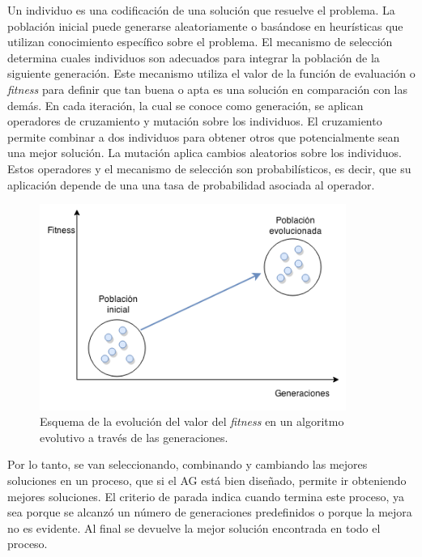 Un individuo es una codificación de una solución que resuelve el problema. La población inicial puede generarse aleatoriamente o basándose en heurísticas que utilizan conocimiento específico sobre el problema. El mecanismo de selección determina cuales individuos son adecuados para integrar la población de la siguiente generación. Este mecanismo utiliza el valor de la función de evaluación o \emph{fitness} para definir que tan buena o apta es una solución en comparación con las demás. En cada iteración, la cual se conoce como generación, se aplican operadores de cruzamiento y mutación sobre los individuos. El cruzamiento permite combinar a dos individuos para obtener otros que potencialmente sean una mejor solución. La mutación aplica cambios aleatorios sobre los individuos. Estos operadores y el mecanismo de selección son probabilísticos, es decir, que su aplicación depende de una una tasa de probabilidad asociada al operador.


\begin{figure}[ht]
	\centering
	\includegraphics[width=10cm]{Figures/fitness_generaciones}
	\caption[Esquema de la evolución del valor del fitness en un algoritmo evolutivo ]{Esquema de la evolución del valor del \emph{fitness} en un algoritmo evolutivo a través de las generaciones.}
	\label{fig:fitness_generaciones}
\end{figure}

Por lo tanto, se van seleccionando, combinando y cambiando las mejores soluciones en un proceso, que si el AG está bien diseñado, permite ir obteniendo mejores soluciones. El criterio de parada indica cuando termina este proceso, ya sea porque se alcanzó un número de generaciones predefinidos o porque la mejora no es evidente. Al final se devuelve la mejor solución encontrada en todo el proceso.



